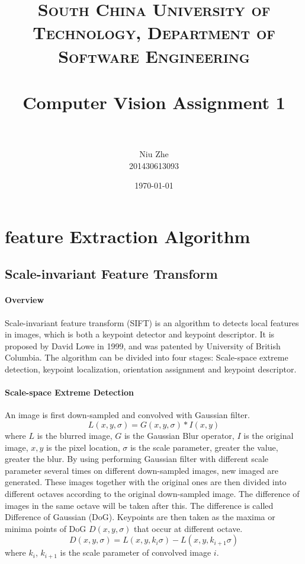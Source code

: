 \documentclass[paper=a4, fontsize=11pt]{scrartcl} %
\title{	
\normalfont \normalsize 
\textsc{South China University of Technology, Department of Software Engineering} \\ [25pt] %
\horrule{0.5pt} \\[0.4cm] %
\huge Computer Vision Assignment 1 \\ %
\horrule{2pt} \\[0.5cm] %
}
\author{Niu Zhe \\201430613093} %
\date{\normalsize\today} %
\numberwithin{equation}{section} %
\numberwithin{figure}{section} %
\numberwithin{table}{section} %
\begin{document}
\maketitle %


\section{feature Extraction Algorithm}


\subsection{Scale-invariant Feature Transform}

\paragraph{Overview}
Scale-invariant feature transform (SIFT) is an algorithm to detects local features in images, 
which is both a keypoint detector and keypoint descriptor. 
It is proposed by David Lowe in 1999, and was patented by University of British Columbia.
The algorithm can be divided into four stages: 
Scale-space extreme detection, keypoint localization, orientation assignment and keypoint descriptor. 

\paragraph{Scale-space Extreme Detection}
An image is first down-sampled and convolved with Gaussian filter.
$$
L(x, y, \sigma) = G(x, y, \sigma) * I(x, y)
$$
where 
$L$ is the blurred image, 
$G$ is the Gaussian Blur operator, 
$I$ is the original image, 
$x, y$ is the pixel location, 
$\sigma$ is the scale parameter, greater the value, greater the blur.
By using performing Gaussian filter with different scale parameter several times on different down-sampled images, new imaged are generated.
These images together with the original ones are then divided into different octaves according to the original down-sampled image.
The difference of images in the same octave will be taken after this. The difference is called Difference of Gaussian (DoG). 
Keypoints are then taken as the maxima or minima points of DoG $D(x, y, \sigma)$ that occur at different octave.
$$
D(x, y, \sigma) = L(x, y, k_i\sigma) - L(x, y, k_{i+1}\sigma)
$$
where $k_i$, $k_{i+1}$ is the scale parameter of convolved image $i$.
\end{document}
